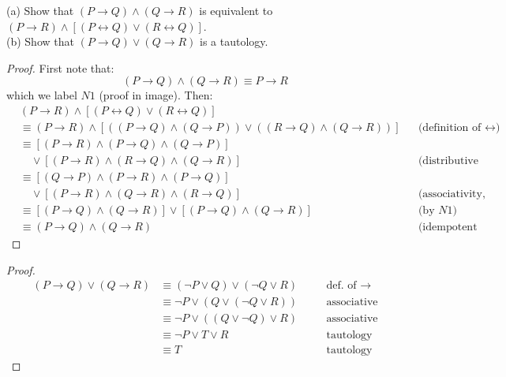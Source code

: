 \begin{tcolorbox}[title=Problem 8 (a), breakable]
(a) Show that $(P \rightarrow Q) \wedge (Q \rightarrow R)$ is equivalent to 
$(P \rightarrow R) \wedge [(P \leftrightarrow Q) \vee (R \leftrightarrow Q)]$. \\
(b) Show that $(P \rightarrow Q) \vee (Q \rightarrow R)$ is a tautology.
\end{tcolorbox}

\begin{proof}
First note that:
\[
(P \rightarrow Q) \wedge (Q \rightarrow R) \equiv P \rightarrow R
\]
which we label $N1$ (proof in image). Then:
\begin{align*}
& (P \rightarrow R) \wedge [(P \leftrightarrow Q) \vee (R \leftrightarrow Q)] \\
& \equiv (P \rightarrow R) \wedge 
\left[((P \rightarrow Q) \wedge (Q \rightarrow P)) 
\vee ((R \rightarrow Q) \wedge (Q \rightarrow R))\right] 
&& \text{(definition of $\leftrightarrow$)} \\
& \equiv \left[(P \rightarrow R) \wedge (P \rightarrow Q) \wedge (Q \rightarrow P)\right] \\
& \quad \vee \left[(P \rightarrow R) \wedge (R \rightarrow Q) \wedge (Q \rightarrow R)\right]
&& \text{(distributive law)} \\
& \equiv \left[(Q \rightarrow P) \wedge (P \rightarrow R) \wedge (P \rightarrow Q)\right] \\
& \quad \vee \left[(P \rightarrow R) \wedge (Q \rightarrow R) \wedge (R \rightarrow Q)\right]
&& \text{(associativity, commutativity)} \\
& \equiv \left[(P \rightarrow Q) \wedge (Q \rightarrow R)\right] 
\vee \left[(P \rightarrow Q) \wedge (Q \rightarrow R)\right]
&& \text{(by $N1$)} \\
& \equiv (P \rightarrow Q) \wedge (Q \rightarrow R)
&& \text{(idempotent law)}
\end{align*}
\end{proof}

\begin{proof}
\begin{align*}
(P \rightarrow Q) \vee (Q \rightarrow R) &\equiv (\neg P \vee Q) \vee (\neg Q \vee R) && \quad \text{def. of $\rightarrow$} \\
&\equiv \neg P \vee (Q \vee (\neg Q \vee R)) && \quad \text{associative} \\
&\equiv \neg P \vee ((Q \vee \neg Q) \vee R) && \quad \text{associative} \\
&\equiv \neg P \vee T \vee R && \quad \text{tautology} \\
&\equiv T && \quad \text{tautology}
\end{align*}
\end{proof}


